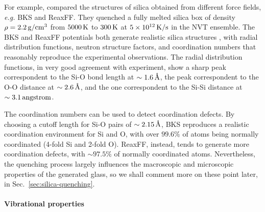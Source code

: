 For example, \citet{Tian2017} compared the structures of silica obtained from different force fields, \emph{e.g.} BKS and ReaxFF. They quenched a fully melted silica box of density $\rho=2.2\,\mathrm{g/cm^3}$ from $5000\,\mathrm{K}$ to $300\,\mathrm{K}$ at $5\times 10^{12}\,\mathrm{K/s}$ in the NVT ensemble. 
The BKS and ReaxFF potentials both generate realistic silica structures \cite{Vollmayr1996,Yuan2001}, with radial distribution functions, neutron structure factors, and coordination numbers that reasonably reproduce the experimental observations.
The radial distribution functions, in very good agreement with experiment, show a sharp peak correspondent to the Si-O bond length at $\sim 1.6\,\mathrm{{\mbox{\AA}}}$, the peak correspondent to the O-O distance at $\sim 2.6\,\mathrm{{\mbox{\AA}}}$, and the one correspondent to the Si-Si distance at $\sim 3.1\,\mathrm{angstrom}$. 

The coordination numbers can be used to detect coordination defects. By choosing a cutoff length for Si-O pairs of $\sim 2.15\,\mathrm{{\mbox{\AA}}}$, BKS reproduces a realistic coordination environment for Si and O, with over $99.6\%$ of atoms being normally coordinated (4-fold Si and 2-fold O). ReaxFF, instead, tends to generate more coordination defects, with $\sim 97.5\%$ of normally coordinated atoms.
Nevertheless, the quenching process largely influences the macroscopic and microscopic properties of the generated glass, so we shall comment more on these point later, in Sec.~\ref{sec:silica-quenching}. 


\paragraph{Vibrational properties}


